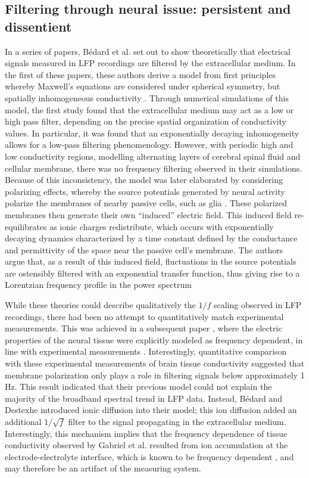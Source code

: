 \subsection{Filtering through neural issue: persistent and dissentient}
In a series of papers, Bédard et al.\cite{Bedard2004,Bedard2006a,Bedard2009} set out to show theoretically that electrical signals measured in LFP recordings are filtered by the extracellular medium. In the first of these papers, these authors derive a model from first principles whereby Maxwell’s equations are considered under spherical symmetry, but spatially inhomogeneous conductivity \cite{Bedard2004}. Through numerical simulations of this model, the first study found that the extracellular medium may act as a low or high pass filter, depending on the precise spatial organization of conductivity values. In particular, it was found that an exponentially decaying inhomogeneity allows for a low-pass filtering phenomenology. However, with periodic high and low conductivity regions, modelling alternating layers of cerebral spinal fluid and cellular membrane, there was no frequency filtering observed in their simulations. Because of this inconsistency, the model was later elaborated by considering polarizing effects, whereby the source potentials generated by neural activity polarize the membranes of nearby passive cells, such as glia \cite{Bedard2006a}. These polarized membranes then generate their own “induced” electric field. This induced field re-equilibrates as ionic charges redistribute, which occurs with exponentially decaying dynamics characterized by a time constant defined by the conductance and permittivity of the space near the passive cell’s membrane. The authors argue that, as a result of this induced field, fluctuations in the source potentials are ostensibly filtered with an exponential transfer function, thus giving rise to a Lorentzian frequency profile in the power spectrum

While these theories could describe qualitatively the $1/f$ scaling observed in LFP recordings, there had been no attempt to quantitatively match experimental measurements. This was achieved in a subsequent paper \cite{Bedard2009}, where the electric properties of the neural tissue were explicitly modeled as frequency dependent, in line with experimental measurements \cite{Gabriel1996}. Interestingly, quantitative comparison with these experimental measurements of brain tissue conductivity suggested that membrane polarization only plays a role in filtering signals below approximately 1 Hz. This result indicated that their previous model \cite{Bedard2006a} could not explain the majority of the broadband spectral trend in LFP data. Instead, Bédard and Destexhe\cite{Bedard2006a} introduced ionic diffusion into their model; this ion diffusion added an additional $1/\sqrt{f}$ filter to the signal propagating in the extracellular medium. Interestingly, this mechanism implies that the frequency dependence of tissue conductivity observed by Gabriel et al.\cite{Gabriel1996} resulted from ion accumulation at the electrode-electrolyte interface, which is known to be frequency dependent \cite{Warburg1899}, and may therefore be an artifact of the measuring system.

